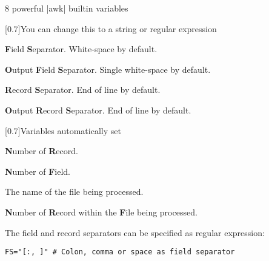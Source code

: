\begin{frame}[fragile]{8 powerful \bash|awk| builtin variables}
    \vspace{-4mm}
    \begin{varblock}{}[0.7\textwidth]{You can change this to a string or regular expression}
        \begin{description}[XXXXXX]
            \item[\textbf{FS}] \textbf{F}ield \textbf{S}eparator. \alert{White-space} by default.
            \item[\textbf{OFS}] \textbf{O}utput \textbf{F}ield \textbf{S}eparator. \alert{Single white-space} by default.
            \item[\textbf{RS}] \textbf{R}ecord \textbf{S}eparator. \alert{End of line} by default.
            \item[\textbf{ORS}] \textbf{O}utput \textbf{R}ecord \textbf{S}eparator. \alert{End of line} by default.
        \end{description}
    \end{varblock}
    \begin{varblock}{}[0.7\textwidth]{Variables automatically set}
        \begin{description}
            \item[\textbf{NR}] \textbf{N}umber of \textbf{R}ecord.
            \item[\textbf{NF}] \textbf{N}umber of \textbf{F}ield.
            \item[\textbf{FILENAME}] The name of the file being processed.
            \item[\textbf{FNR}] \textbf{N}umber of \textbf{R}ecord within the \textbf{F}ile being processed.
        \end{description}
    \end{varblock}
    \begin{center}
        The field and record separators can be specified as regular expression:
        \begin{lstlisting}[style=MyBash, numbers=none, aboveskip=2mm, xleftmargin=9mm, xrightmargin=9mm]
            FS="[:, ]" # Colon, comma or space as field separator
        \end{lstlisting}
    \end{center}
\end{frame}
